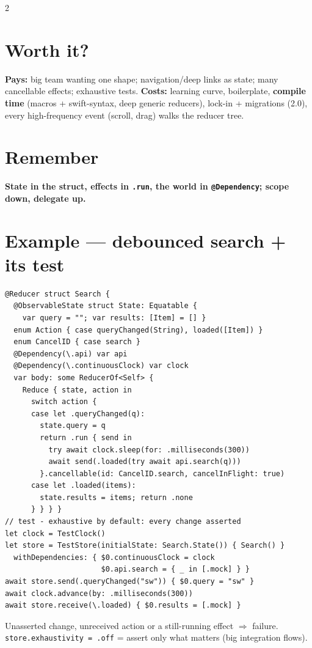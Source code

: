 \documentclass[8pt]{extarticle}
\begin{document}
\begin{multicols}{2}
\section{Worth it?}
\textbf{Pays:} big team wanting one shape; navigation/deep links as state; many cancellable
effects; exhaustive tests. \textbf{Costs:} learning curve, boilerplate, \textbf{compile time}
(macros + swift-syntax, deep generic reducers), lock-in + migrations (2.0), every
high-frequency event (scroll, drag) walks the reducer tree.

\section{Remember}
\textbf{State in the struct, effects in \texttt{.run}, the world in \texttt{@Dependency};
scope down, delegate up.}

\columnbreak

\section{Example — debounced search + its test}
\begin{lstlisting}[language=SwiftSheet]
@Reducer struct Search {
  @ObservableState struct State: Equatable {
    var query = ""; var results: [Item] = [] }
  enum Action { case queryChanged(String), loaded([Item]) }
  enum CancelID { case search }
  @Dependency(\.api) var api
  @Dependency(\.continuousClock) var clock
  var body: some ReducerOf<Self> {
    Reduce { state, action in
      switch action {
      case let .queryChanged(q):
        state.query = q
        return .run { send in
          try await clock.sleep(for: .milliseconds(300))
          await send(.loaded(try await api.search(q)))
        }.cancellable(id: CancelID.search, cancelInFlight: true)
      case let .loaded(items):
        state.results = items; return .none
      } } } }
// test - exhaustive by default: every change asserted
let clock = TestClock()
let store = TestStore(initialState: Search.State()) { Search() }
  withDependencies: { $0.continuousClock = clock
                      $0.api.search = { _ in [.mock] } }
await store.send(.queryChanged("sw")) { $0.query = "sw" }
await clock.advance(by: .milliseconds(300))
await store.receive(\.loaded) { $0.results = [.mock] }
\end{lstlisting}
{\footnotesize Unasserted change, unreceived action or a still-running effect $\Rightarrow$
failure. \texttt{store.exhaustivity = .off} = assert only what matters (big integration flows).}


\end{multicols}
\end{document}
